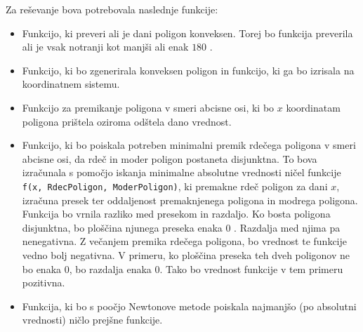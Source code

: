 \documentclass[a4paper,12pt]{article}
\begin{document}
 Za reševanje bova potrebovala naslednje funkcije:
\begin{itemize}
\item Funkcijo, ki preveri ali je dani poligon konveksen. Torej bo funkcija preverila ali je vsak notranji kot manjši ali enak $180$ \degree. 
\item Funkcijo, ki bo zgenerirala konveksen poligon in funkcijo, ki ga bo izrisala na koordinatnem sistemu.
\item Funkcijo za premikanje poligona v smeri abcisne osi, ki bo $x$ koordinatam poligona prištela oziroma odštela dano vrednost. 
\item Funkcijo, ki bo poiskala potreben minimalni premik rdečega poligona v smeri abcisne osi, da rdeč in moder poligon postaneta disjunktna. To bova izračunala s pomočjo iskanja minimalne absolutne vrednosti ničel 
funkcije \texttt{f(x, RdecPoligon, ModerPoligon)}, ki premakne rdeč poligon za dani $x$, izračuna presek ter oddaljenost premaknjenega poligona in modrega poligona. Funkcija 
bo vrnila razliko med presekom in razdaljo. Ko bosta poligona disjunktna, bo ploščina njunega preseka enaka $0$ . Razdalja med njima pa nenegativna. Z večanjem premika rdečega poligona,
 bo vrednost te funkcije vedno bolj negativna. V primeru, ko ploščina preseka teh dveh poligonov ne bo enaka $0$, bo razdalja enaka $0$. Tako bo vrednost funkcije v tem primeru pozitivna. 
\item Funkcija, ki bo s poočjo Newtonove metode poiskala najmanjšo (po absolutni vrednosti) ničlo prejšne funkcije. 
\end{itemize}

\end{document}
